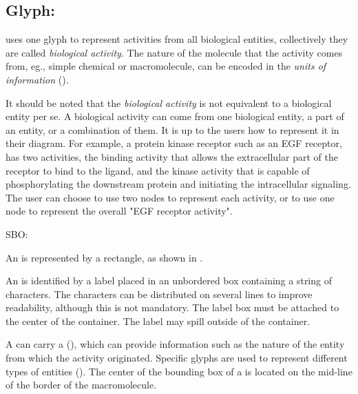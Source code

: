 \subsection{Glyph: }
\label{sec:af:biologicalActivity}


\SBGNAFLone uses one glyph to represent activities from all biological entities, collectively they are called \emph{biological activity}. The nature of the molecule that the activity comes from, eg., simple chemical or macromolecule, can be encoded in the \emph{units of information} (). 

It should be noted that the \emph{biological activity} is not equivalent to a biological entity per se.  A biological activity can come from one biological entity, a part of an entity, or a combination of  them.  It is up to the users how to represent it in their diagram.  For example, a protein kinase receptor such as an EGF receptor, has two activities, the binding activity that allows the extracellular part of the receptor to bind to the ligand, and the kinase activity that is capable of phosphorylating the downstream protein and initiating the intracellular signaling.  The user can choose to use two nodes to represent each activity, or to use one node to represent the overall "EGF receptor activity".

\begin{glyphDescription}

\glyphSboTerm SBO:

\glyphContainer An  is represented by a rectangle, as shown in .

\glyphLabel An  is identified by a label placed in an unbordered box containing a string of characters.  The characters can be distributed on several lines to improve readability, although this is not mandatory.  The label box must be attached to the center of the container.  The label may spill outside of the container.

\glyphAux A  can carry a  (), which can provide information such as the nature of the entity from which the activity originated.  Specific glyphs are used to represent different types of entities ().  The center of the bounding box of a  is located on the mid-line of the border of the macromolecule.

\end{glyphDescription}

